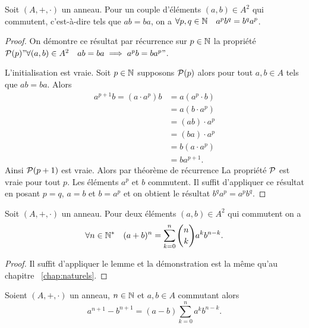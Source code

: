 \begin{lemme}
  Soit \((A,+,\cdot)\) un anneau. Pour un couple d'éléments \((a,b) \in A^2\) qui commutent, c'est-à-dire tels que \(ab=ba\), on a \(\forall p,q \in \N \quad a^pb^q=b^qa^p\).
\end{lemme}
\begin{proof}
  On démontre ce résultat par récurrence sur \(p \in \N\) la propriété \(\P(p) "\forall (a,b) \in A^2 \quad ab=ba \implies a^pb=ba^p"\).

  L'initialisation est vraie. Soit \(p \in \N\) supposons \(\P(p)\) alors pour tout \(a,b \in A\) tels que \(ab=ba\). Alors
  \begin{align}
    a^{p+1}b=(a \cdot a^p)b&=a(a^p \cdot b) \\
                           &=a(b\cdot a^p)\\
                           &=(ab) \cdot a^p\\
                           &=(ba) \cdot a^p\\
                           &=b(a \cdot a^p)\\
                           &=b a^{p+1}.
  \end{align}
  Ainsi \(\P(p+1)\) est vraie. Alors par théorème de récurrence La propriété \(\P\) est vraie pour tout \(p\). Les éléments \(a^p\) et \(b\) commutent. Il suffit d'appliquer ce résultat en posant \(p=q\), \(a=b\) et \(b=a^p\) et on obtient le résultat \(b^qa^p=a^pb^q\).
\end{proof}
\begin{theo}
  Soit \((A,+,\cdot)\) un anneau. Pour deux éléments \((a,b) \in A^2\) qui commutent on a
  \begin{equation}
    \forall n \in \N^* \quad (a+b)^n=\sum_{k=0}^n \binom{n}{k} a^k b^{n-k}.
  \end{equation}
\end{theo}
\begin{proof}
  Il suffit d'appliquer le lemme et la démonstration est la même qu'au chapitre~
  \ref{chap:naturels}.
\end{proof}
\begin{theo}
  Soient \((A,+,\cdot)\) un anneau, \(n \in \N\) et \(a,b \in A\) commutant alors
  \begin{equation}
    a^{n+1}-b^{n+1}=(a-b)\sum_{k=0}^n a^kb^{n-k}.
  \end{equation}
\end{theo}
